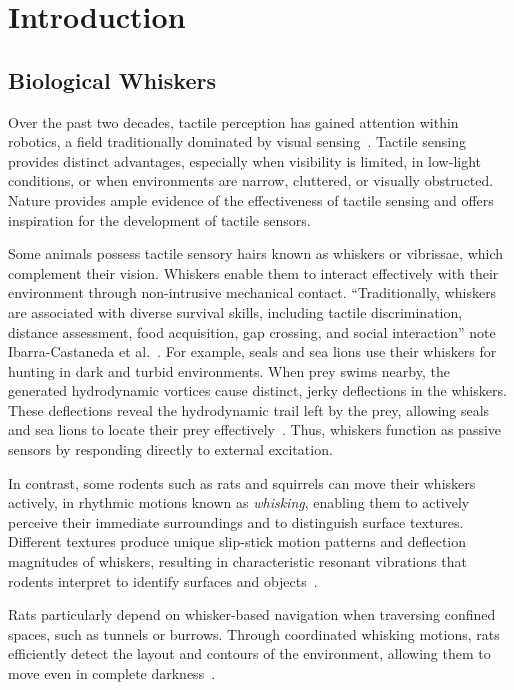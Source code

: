 

\chapter{Introduction}


\section{Biological Whiskers}

Over the past two decades, tactile perception has gained attention within robotics, a field traditionally dominated by visual sensing~\cite{s22072705}.
Tactile sensing provides distinct advantages, especially when visibility is limited, in low-light conditions, or when environments are narrow, cluttered, or visually obstructed.
Nature provides ample evidence of the effectiveness of tactile sensing and offers inspiration for the development of tactile sensors.

Some animals possess tactile sensory hairs known as whiskers or vibrissae, which complement their vision.
Whiskers enable them to interact effectively with their environment through non-intrusive mechanical contact.
\enquote{Traditionally, whiskers are associated with diverse survival skills, including tactile discrimination, distance assessment, food acquisition, gap crossing, and social interaction} note Ibarra-Castaneda et al.~\cite{IBARRACASTANEDA2022100034}.
For example, seals and sea lions use their whiskers for hunting in dark and turbid environments.
When prey swims nearby, the generated hydrodynamic vortices cause distinct, jerky deflections in the whiskers.
These deflections reveal the hydrodynamic trail left by the prey, allowing seals and sea lions to locate their prey effectively~\cite{muthuramalingam2018sealsealionwhiskers}.
Thus, whiskers function as passive sensors by responding directly to external excitation.

In contrast, some rodents such as rats and squirrels can move their whiskers actively, in rhythmic motions known as \textit{whisking}, enabling them to actively perceive their immediate surroundings and to distinguish surface textures.
Different textures produce unique slip-stick motion patterns and deflection magnitudes of whiskers, resulting in characteristic resonant vibrations that rodents interpret to identify surfaces and objects~\cite{wolfe2008texture}.

Rats particularly depend on whisker-based navigation when traversing confined spaces, such as tunnels or burrows.
Through coordinated whisking motions, rats efficiently detect the layout and contours of the environment, allowing them to move even in complete darkness~\cite{*}.

